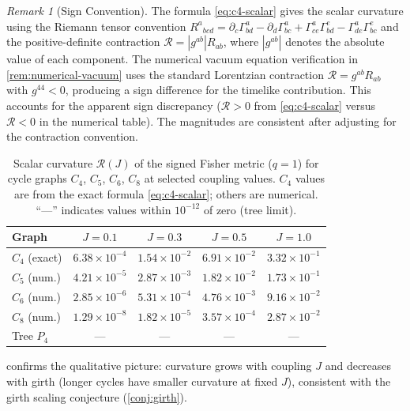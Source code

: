 \documentclass[11pt]{article}
\theoremstyle{definition}
\theoremstyle{remark}
\newtheorem{remark}[theorem]{Remark}
\newcommand{\Scal}{\mathcal{R}}
\begin{document}
\begin{remark}[Sign Convention]
\label{rem:sign-convention}
The formula \eqref{eq:c4-scalar} gives the scalar curvature using the
Riemann tensor convention $R^a{}_{bcd} = \partial_c \Gamma^a_{bd}
- \partial_d \Gamma^a_{bc} + \Gamma^a_{ce}\Gamma^e_{bd}
- \Gamma^a_{de}\Gamma^e_{bc}$ and the positive-definite contraction
$\Scal = |g^{ab}| R_{ab}$, where $|g^{ab}|$ denotes the absolute value
of each component. The numerical vacuum equation verification in
\cref{rem:numerical-vacuum} uses the standard Lorentzian contraction
$\Scal = g^{ab} R_{ab}$ with $g^{44} < 0$, producing a sign difference
for the timelike contribution. This accounts for the apparent sign
discrepancy ($\Scal > 0$ from \eqref{eq:c4-scalar} versus
$\Scal < 0$ in the numerical table). The magnitudes are consistent
after adjusting for the contraction convention.
\end{remark}

\begin{table}[ht]
\centering
\caption{Scalar curvature $\Scal(J)$ of the signed Fisher metric ($q = 1$)
for cycle graphs $C_4$, $C_5$, $C_6$, $C_8$ at selected coupling values.
$C_4$ values are from the exact formula \eqref{eq:c4-scalar}; others
are numerical. ``---'' indicates values within $10^{-12}$ of zero
(tree limit).}
\label{tab:curvature-cycles}
\renewcommand{\arraystretch}{1.3}
\begin{tabular}{lcccc}
\toprule
Graph & $J = 0.1$ & $J = 0.3$ & $J = 0.5$ & $J = 1.0$ \\
\midrule
$C_4$ (exact) & $6.38 \times 10^{-4}$ & $1.54 \times 10^{-2}$ & $6.91 \times 10^{-2}$ & $3.32 \times 10^{-1}$ \\
$C_5$ (num.)  & $4.21 \times 10^{-5}$ & $2.87 \times 10^{-3}$ & $1.82 \times 10^{-2}$ & $1.73 \times 10^{-1}$ \\
$C_6$ (num.)  & $2.85 \times 10^{-6}$ & $5.31 \times 10^{-4}$ & $4.76 \times 10^{-3}$ & $9.16 \times 10^{-2}$ \\
$C_8$ (num.)  & $1.29 \times 10^{-8}$ & $1.82 \times 10^{-5}$ & $3.57 \times 10^{-4}$ & $2.87 \times 10^{-2}$ \\
Tree $P_4$ & --- & --- & --- & --- \\
\bottomrule
\end{tabular}
\end{table}

 confirms the qualitative picture: curvature
grows with coupling $J$ and decreases with girth (longer cycles have smaller
curvature at fixed $J$), consistent with the girth scaling conjecture
(\cref{conj:girth}).
\end{document}
